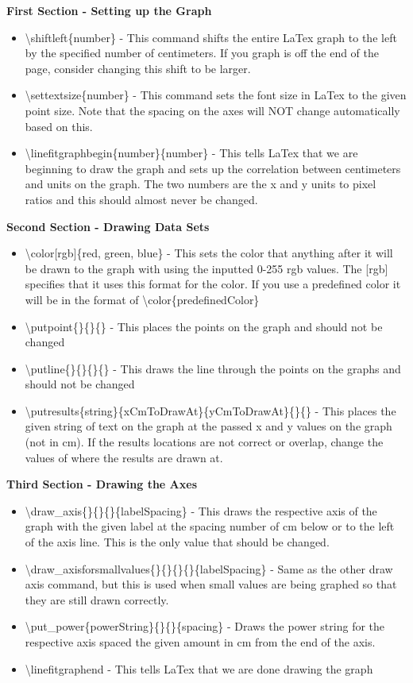 \documentclass[titlepage,12pt]{article}
\begin{document}
\textbf{First Section - Setting up the Graph}
\begin{itemize}
\item \textbackslash{}shiftleft\{number\} - This command shifts the entire LaTex graph to the left by the specified number of centimeters. If you graph is off the end of the page, consider changing this shift to be larger.
\item \textbackslash{}settextsize\{number\} - This command sets the font size in LaTex to the given point size. Note that the spacing on the axes will NOT change automatically based on this.
\item \textbackslash{}linefitgraphbegin\{number\}\{number\} - This tells LaTex that we are beginning to draw the graph and sets up the correlation between centimeters and units on the graph. The two numbers are the x and y units to pixel ratios and this should almost never be changed.
\end{itemize}

\textbf{Second Section - Drawing Data Sets}
\begin{itemize}
\item \textbackslash{}color[rgb]\{red, green, blue\} - This sets the color that anything after it will be drawn to the graph with using the inputted 0-255 rgb values. The [rgb] specifies that it uses this format for the color. If you use a predefined color it will be in the format of \textbackslash{}color\{predefinedColor\}
\item \textbackslash{}putpoint\{\}\{\}\{\} - This places the points on the graph and should not be changed
\item \textbackslash{}putline\{\}\{\}\{\}\{\} - This draws the line through the points on the graphs and should not be changed
\item \textbackslash{}putresults\{string\}\{xCmToDrawAt\}\{yCmToDrawAt\}\{\}\{\} - This places the given string of text on the graph at the passed x and y values on the graph (not in cm). If the results locations are not correct or overlap, change the values of where the results are drawn at.
\end{itemize}

\textbf{Third Section - Drawing the Axes}
\begin{itemize}
\item \textbackslash{}draw\_axis\{\}\{\}\{\}\{labelSpacing\} - This draws the respective axis of the graph with the given label at the spacing number of cm below or to the left of the axis line. This is the only value that should be changed.
\item \textbackslash{}draw\_axisforsmallvalues\{\}\{\}\{\}\{\}\{labelSpacing\} - Same as the other draw axis command, but this is used when small values are being graphed so that they are still drawn correctly.
\item \textbackslash{}put\_power\{powerString\}\{\}\{\}\{spacing\} - Draws the power string for the respective axis spaced the given amount in cm from the end of the axis.
\item \textbackslash{}linefitgraphend - This tells LaTex that we are done drawing the graph
\end{itemize}
\end{document}
